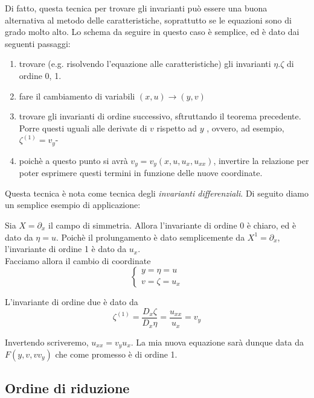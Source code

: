 \documentclass{report}
\begin{document}
Di fatto, questa tecnica per trovare gli invarianti può essere una buona alternativa al metodo delle caratteristiche, soprattutto se le equazioni sono di grado molto alto. Lo schema da seguire in questo caso è semplice, ed è dato dai seguenti passaggi: 

\begin{enumerate}
    \item trovare (e.g. risolvendo l'equazione alle caratteristiche) gli invarianti $\eta. \zeta$ di ordine 0, 1. 
    \item fare il cambiamento di variabili $(x, u) \rightarrow (y, v)$\\
    \item trovare gli invarianti di ordine successivo, sftruttando il teorema precedente. Porre questi uguali alle derivate di $v$ rispetto ad $y$ , ovvero, ad esempio, $\zeta^{(1)} = v_y$- 
    \item poichè a questo punto si avrà $v_y = v_y(x, u, u_x, u_{xx})$, invertire la relazione per poter esprimere questi termini in funzione delle nuove coordinate. \\
\end{enumerate}

    Questa tecnica è nota come tecnica degli \emph{invarianti differenziali}. Di seguito diamo un semplice esempio di applicazione: 

    \begin{example}
        Sia $X= \partial_x$ il campo di simmetria. Allora l'invariante di ordine 0 è chiaro, ed è dato da $\eta = u$. Poichè il prolungamento è dato semplicemente da $X^1= \partial_x$, l'invariante di ordine 1 è dato da $u_x$. \\
        Facciamo allora il cambio di coordinate 
        \[\begin{cases}
            y = \eta = u \\ v = \zeta = u_x
        \end{cases}\]

        L'invariante di ordine due è dato da 
        \begin{equation}
            \zeta^{(1)} = \frac{D_x \zeta}{D_x \eta} = \frac{u_{xx}}{u_x} = v_y
        \end{equation}

        Invertendo scriveremo, $u_{xx} = v_yu_x$. La mia nuova equazione sarà dunque data da $F(y, v, vv_y)$ che come promesso è di ordine 1. 
    \end{example}

\subsection{Ordine di riduzione}
\end{document}
